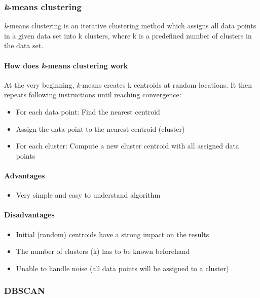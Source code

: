 
\subsubsection{\textit{k}-means clustering}
\label{subsubsec:3_kmeans_clustering}

\textit{k}-means clustering is an iterative clustering method which assigns all data points in a given data set
into k clusters, where k is a predefined number of clusters in the data set.

\paragraph{How does \textit{k}-means clustering work}
At the very beginning, \textit{k}-means creates k centroids at random locations.
It then repeats following instructions until reaching convergence:

\begin{itemize}
    \item For each data point: Find the nearest centroid
    \item Assign the data point to the nearest centroid (cluster)
    \item For each cluster: Compute a new cluster centroid with all assigned data points
\end{itemize}

\paragraph{Advantages}
\begin{itemize}
    \item Very simple and easy to understand algorithm
\end{itemize}

\paragraph{Disadvantages}
\begin{itemize}
    \item Initial (random) centroids have a strong impact on the results
    \item The number of clusters (k) has to be known beforehand
    \item Unable to handle noise (all data points will be assigned to a cluster)
\end{itemize}

\subsubsection{DBSCAN}
\label{subsubsec:3_dbscan}

